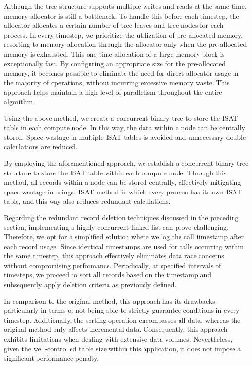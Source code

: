 Although the tree structure supports multiple writes and reads at the same time, memory allocator is still a bottleneck. To handle this before each timestep, the allocator allocates a certain number of tree leaves and tree nodes for each process. In every timestep, we prioritize the utilization of pre-allocated memory, resorting to memory allocation through the allocator only when the pre-allocated memory is exhausted. This one-time allocation of a large memory block is exceptionally fast. By configuring an appropriate size for the pre-allocated memory, it becomes possible to eliminate the need for direct allocator usage in the majority of operations, without incurring excessive memory waste. This approach helps maintain a high level of parallelism throughout the entire algorithm.

Using the above method, we create a concurrent binary tree to store the ISAT table in each compute node. In this way, the data within a node can be centrally stored. Space wastage in multiple ISAT tables is avoided and unnecessary double calculations are reduced.

By employing the aforementioned approach, we establish a concurrent binary tree structure to store the ISAT table within each compute node. Through this method, all records within a node can be stored centrally, effectively mitigating space wastage in oringal ISAT method in which every process has its own ISAT table, and this way also reduces redundant calculations.


Regarding the redundant record deletion techniques discussed in the preceding section, implementing a highly concurrent linked list can prove challenging. Therefore, we opt for a simplified solution where we log the call timestamp after each record usage. Since identical timestamps are used for calls occurring within the same timestep, this approach effectively eliminates data race concerns without compromising performance. Periodically, at specified intervals of timesteps, we proceed to sort all records based on the timestamp and subsequently apply deletion criteria as previously defined.

In comparison to the original method, this approach has its drawbacks, particularly in terms of not being able to strictly guarantee conditions in every timestep. Additionally, the sorting operation encompasses all data, whereas the original method only affects incremental data. Consequently, this approach exhibits limitations when dealing with extensive data volumes. Nevertheless, given the well-controlled table size within this application, it does not impose a significant performance penalty.

